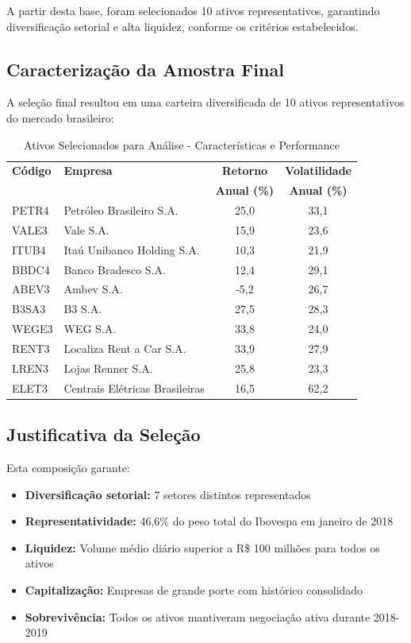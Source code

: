 A partir desta base, foram selecionados 10 ativos representativos, garantindo diversificação setorial e alta liquidez, conforme os critérios estabelecidos.

\subsection{Caracterização da Amostra Final}

A seleção final resultou em uma carteira diversificada de 10 ativos representativos do mercado brasileiro:

\begin{table}[H]
\centering
\caption{Ativos Selecionados para Análise - Características e Performance}
\begin{tabular}{llcc}
\toprule
\textbf{Código} & \textbf{Empresa} & \textbf{Retorno} & \textbf{Volatilidade} \\
& & \textbf{Anual (\%)} & \textbf{Anual (\%)} \\
\midrule
PETR4 & Petróleo Brasileiro S.A. & 25,0 & 33,1 \\
VALE3 & Vale S.A. & 15,9 & 23,6 \\
ITUB4 & Itaú Unibanco Holding S.A. & 10,3 & 21,9 \\
BBDC4 & Banco Bradesco S.A. & 12,4 & 29,1 \\
ABEV3 & Ambev S.A. & -5,2 & 26,7 \\
B3SA3 & B3 S.A. & 27,5 & 28,3 \\
WEGE3 & WEG S.A. & 33,8 & 24,0 \\
RENT3 & Localiza Rent a Car S.A. & 33,9 & 27,9 \\
LREN3 & Lojas Renner S.A. & 25,8 & 23,3 \\
ELET3 & Centrais Elétricas Brasileiras & 16,5 & 62,2 \\
\bottomrule
\end{tabular}
\label{tab:ativos_selecionados}
\end{table}

\subsection{Justificativa da Seleção}

Esta composição garante:
\begin{itemize}
    \item \textbf{Diversificação setorial:} 7 setores distintos representados
    \item \textbf{Representatividade:} 46,6\% do peso total do Ibovespa em janeiro de 2018
    \item \textbf{Liquidez:} Volume médio diário superior a R\$ 100 milhões para todos os ativos
    \item \textbf{Capitalização:} Empresas de grande porte com histórico consolidado
    \item \textbf{Sobrevivência:} Todos os ativos mantiveram negociação ativa durante 2018-2019
\end{itemize}

